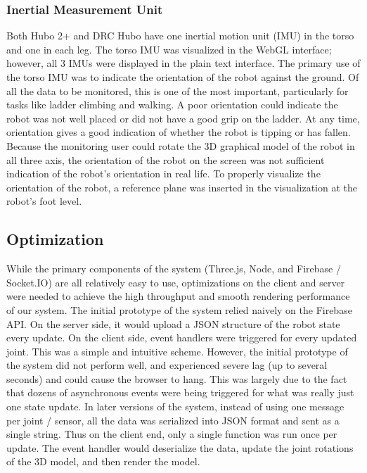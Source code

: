 \documentclass[letterpaper, 10 pt, conference]{ieee/ieeeconf}  %
\begin{document}
\subsubsection{Inertial Measurement Unit}
Both Hubo 2+ and DRC Hubo have one inertial motion unit (IMU) in the torso and one in each leg.
The torso IMU was visualized in the WebGL interface; however, all 3 IMUs were displayed in the plain text interface.
The primary use of the torso IMU was to indicate the orientation of the robot against the ground.
Of all the data to be monitored, this is one of the most important, particularly for tasks like ladder climbing and walking.
A poor orientation could indicate the robot was not well placed or did not have a good grip on the ladder.
At any time, orientation gives a good indication of whether the robot is tipping or has fallen.
Because the monitoring user could rotate the 3D graphical model of the robot in all three axis, the orientation of the robot on the screen was not sufficient indication of the robot's orientation in real life.
To properly visualize the orientation of the robot, a reference plane was inserted in the visualization at the robot's foot level.

\subsection{Optimization}
While the primary components of the system (Three.js, Node, and Firebase / Socket.IO) are all relatively easy to use, optimizations on the client and server were needed to achieve the high throughput and smooth rendering performance of our system.
The initial prototype of the system relied naively on the Firebase API.
On the server side, it would upload a JSON structure of the robot state every update.
On the client side, event handlers were triggered for every updated joint.
This was a simple and intuitive scheme.
However, the initial prototype of the system did not perform well, and experienced severe lag (up to several seconds) and could cause the browser to hang.
This was largely due to the fact that dozens of asynchronous events were being triggered for what was really just one state update.
In later versions of the system, instead of using one message per joint / sensor, all the data was serialized into JSON format and sent as a single string.
Thus on the client end, only a single function was run once per update.
The event handler would deserialize the data, update the joint rotations of the 3D model, and then render the model.
\end{document}
